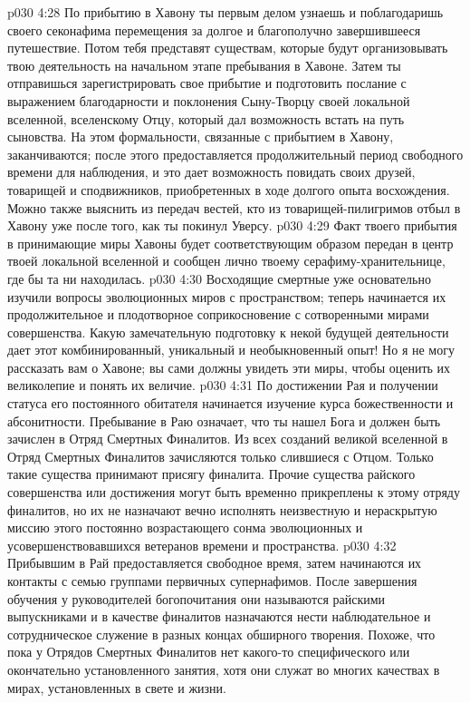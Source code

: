 \vs p030 4:28 По прибытию в Хавону ты первым делом узнаешь и поблагодаришь своего секонафима перемещения за долгое и благополучно завершившееся путешествие. Потом тебя представят существам, которые будут организовывать твою деятельность на начальном этапе пребывания в Хавоне. Затем ты отправишься зарегистрировать свое прибытие и подготовить послание с выражением благодарности и поклонения Сыну\hyp{}Творцу своей локальной вселенной, вселенскому Отцу, который дал возможность встать на путь сыновства. На этом формальности, связанные с прибытием в Хавону, заканчиваются; после этого предоставляется продолжительный период свободного времени для наблюдения, и это дает возможность повидать своих друзей, товарищей и сподвижников, приобретенных в ходе долгого опыта восхождения. Можно также выяснить из передач вестей, кто из товарищей\hyp{}пилигримов отбыл в Хавону уже после того, как ты покинул Уверсу.
\vs p030 4:29 Факт твоего прибытия в принимающие миры Хавоны будет соответствующим образом передан в центр твоей локальной вселенной и сообщен лично твоему серафиму\hyp{}хранительнице, где бы та ни находилась.
\vs p030 4:30 Восходящие смертные уже основательно изучили вопросы эволюционных миров с пространством; теперь начинается их продолжительное и плодотворное соприкосновение с сотворенными мирами совершенства. Какую замечательную подготовку к некой будущей деятельности дает этот комбинированный, уникальный и необыкновенный опыт! Но я не могу рассказать вам о Хавоне; вы сами должны увидеть эти миры, чтобы оценить их великолепие и понять их величие.
\vs p030 4:31 \pc {}\bibnobreakspace {} По достижении Рая и получении статуса его постоянного обитателя начинается изучение курса божественности и абсонитности. Пребывание в Раю означает, что ты нашел Бога и должен быть зачислен в Отряд Смертных Финалитов. Из всех созданий великой вселенной в Отряд Смертных Финалитов зачисляются только слившиеся с Отцом. Только такие существа принимают присягу финалита. Прочие существа райского совершенства или достижения могут быть временно прикреплены к этому отряду финалитов, но их не назначают вечно исполнять неизвестную и нераскрытую миссию этого постоянно возрастающего сонма эволюционных и усовершенствовавшихся ветеранов времени и пространства.
\vs p030 4:32 Прибывшим в Рай предоставляется свободное время, затем начинаются их контакты с семью группами первичных супернафимов. После завершения обучения у руководителей богопочитания они называются райскими выпускниками и в качестве финалитов назначаются нести наблюдательное и сотрудническое служение в разных концах обширного творения. Похоже, что пока у Отрядов Смертных Финалитов нет какого\hyp{}то специфического или окончательно установленного занятия, хотя они служат во многих качествах в мирах, установленных в свете и жизни.
